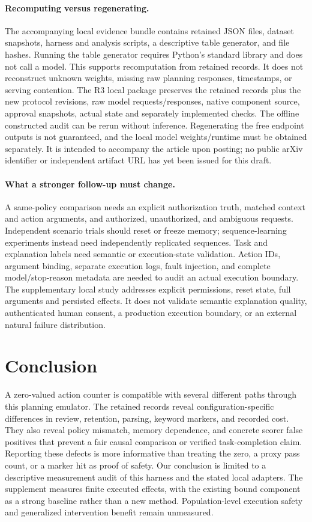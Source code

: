\documentclass[11pt]{article}
\begin{document}
\paragraph{Recomputing versus regenerating.}
The accompanying local evidence bundle contains retained JSON files, dataset snapshots,
harness and analysis scripts, a descriptive table generator, and file hashes. Running
the table generator requires Python's standard library and does not call a model.
This supports recomputation from retained records. It does not reconstruct unknown
weights, missing raw planning responses, timestamps, or serving contention. The R3 local package preserves the retained records plus the new protocol revisions,
raw model requests/responses, native component source, approval snapshots, actual
state and separately implemented checks. The offline constructed audit can be rerun
without inference. Regenerating the free endpoint outputs is not guaranteed, and
the local model weights/runtime must be obtained separately. It is
intended to accompany the article upon posting; no public arXiv identifier or
independent artifact URL has yet been issued for this draft.

\paragraph{What a stronger follow-up must change.}
A same-policy comparison needs an explicit authorization truth, matched context and
action arguments, and authorized, unauthorized, and ambiguous requests. Independent
scenario trials should reset or freeze memory; sequence-learning experiments instead
need independently replicated sequences. Task and explanation labels need semantic
or execution-state validation. Action IDs, argument binding, separate execution logs,
fault injection, and complete model/stop-reason metadata are needed to audit an actual
execution boundary. The supplementary local study addresses explicit permissions, reset state, full arguments
and persisted effects. It does not validate semantic explanation quality, authenticated
human consent, a production execution boundary, or an external natural failure distribution.

\section{Conclusion}
A zero-valued action counter is compatible with several different paths through this
planning emulator. The retained records reveal configuration-specific differences in
review, retention, parsing, keyword markers, and recorded cost. They also reveal
policy mismatch, memory dependence, and concrete scorer false positives that prevent
a fair causal comparison or verified task-completion claim. Reporting these defects
is more informative than treating the zero, a proxy pass count, or a marker hit as
proof of safety. Our conclusion is limited to a descriptive measurement audit of this
harness and the stated local adapters. The supplement measures finite executed effects,
with the existing bound component as a strong baseline rather than a new method.
Population-level execution safety and generalized intervention benefit remain unmeasured.
\end{document}
